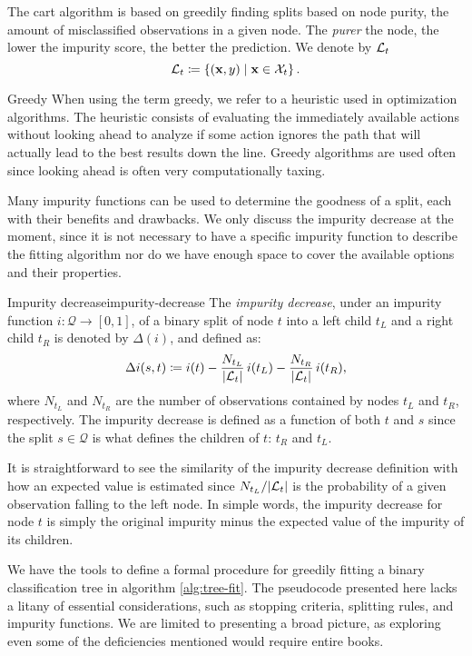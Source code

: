 The \ac{cart} algorithm is based on greedily finding splits based on node
purity, the amount of misclassified observations in a given node. The
\textit{purer} the node, the lower the impurity score, the better the
prediction. We denote by $\mathcal{L}_t$
\[
    \mathcal{L}_t \coloneqq \left\{ (\mathbf{x}, y) \mid \mathbf{x} \in \mathcal{X}_t \right\}.
\]

\begin{remark}{Greedy}
    When using the term greedy, we refer to a heuristic used in optimization
    algorithms. The heuristic consists of evaluating the immediately available
    actions without looking ahead to analyze if some action ignores the path
    that will actually lead to the best results down the line. Greedy algorithms
    are used often since looking ahead is often very computationally taxing.
\end{remark}

Many impurity functions can be used to determine the goodness of a split, each
with their benefits and drawbacks. We only discuss the impurity decrease at the
moment, since it is not necessary to have a specific impurity function to
describe the fitting algorithm nor do we have enough space to cover the
available options and their properties.

\begin{dfn}{Impurity decrease}{impurity-decrease}
    The \emph{impurity decrease}, under an impurity function $i: \mathcal{Q} \to
    [0, 1]$, of a binary split of node $t$ into a left child $t_L$ and a right
    child $t_R$ is denoted by $\Delta(i)$, and defined as: 
    \[
        \Delta i(s, t) \coloneqq i(t) - \frac{N_{t_L}}{|\mathcal{L}_t|} \, i(t_L) - \frac{N_{t_R}}{|\mathcal{L}_t|} \, i(t_R),
    \]
    where $N_{t_L}$ and $N_{t_R}$ are the number of observations contained by
    nodes $t_L$ and $t_R$, respectively. The impurity decrease is defined as a
    function of both $t$ and $s$ since the split $s \in \mathcal{Q}$ is what
    defines the children of $t$: $t_R$ and $t_L$.
\end{dfn}

It is straightforward to see the similarity of the impurity decrease definition
with how an expected value is estimated since $N_{t_L} / |\mathcal{L}_t|$ is the
probability of a given observation falling to the left node. In simple words,
the impurity decrease for node $t$ is simply the original impurity minus the
expected value of the impurity of its children.

We have the tools to define a formal procedure for greedily fitting a binary
classification tree in algorithm \ref{alg:tree-fit}. The pseudocode presented
here lacks a litany of essential considerations, such as stopping criteria,
splitting rules, and impurity functions. We are limited to presenting a broad
picture, as exploring even some of the deficiencies mentioned would require
entire books.

